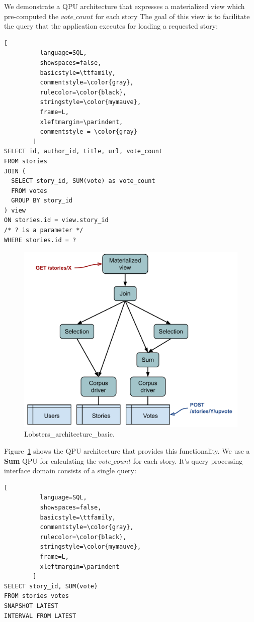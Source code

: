 \noindent
We demonstrate a QPU architecture that expresses a materialized view which pre-computed the $vote\_count$ for each story
The goal of this view is to facilitate the query that the application executes for loading a requested story:

\begin{lstlisting}[
          language=SQL,
          showspaces=false,
          basicstyle=\ttfamily,
          commentstyle=\color{gray},
          rulecolor=\color{black},
          stringstyle=\color{mymauve},
          frame=L,
          xleftmargin=\parindent,
          commentstyle = \color{gray}
        ]
SELECT id, author_id, title, url, vote_count
FROM stories
JOIN (
  SELECT story_id, SUM(vote) as vote_count
  FROM votes
  GROUP BY story_id
) view
ON stories.id = view.story_id
/* ? is a parameter */
WHERE stories.id = ?
\end{lstlisting}

\begin{figure}[t]
  \centering
    \includegraphics[scale=0.5]{./figures/case_studies/lobsters_architecture_basic.pdf}
  \caption{Lobsters\_architecture\_basic.}
  \label{fig:lobsters_architecture_basic}
\end{figure}

Figure~\ref{fig:lobsters_architecture_basic} shows the QPU architecture that provides this functionality.
We use a \textbf{Sum} QPU for calculating the $vote\_count$ for each story.
It's query processing interface domain consists of a single query:

\begin{lstlisting}[
          language=SQL,
          showspaces=false,
          basicstyle=\ttfamily,
          commentstyle=\color{gray},
          rulecolor=\color{black},
          stringstyle=\color{mymauve},
          frame=L,
          xleftmargin=\parindent
        ]
SELECT story_id, SUM(vote)
FROM stories votes
SNAPSHOT LATEST
INTERVAL FROM LATEST
\end{lstlisting}

